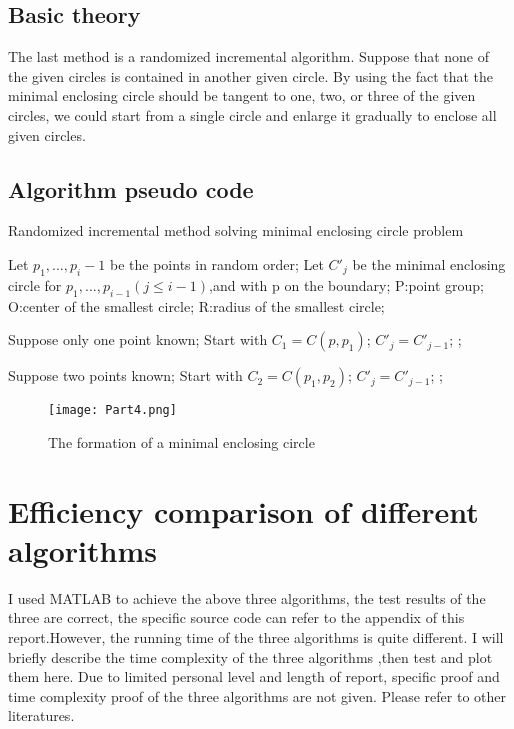 \documentclass[a4paper, 12pt]{article}
\begin{document}
\subsection{Basic theory}
%
The last method  is a randomized incremental algorithm. Suppose that none of the given circles is contained in another given circle. By using the fact that the minimal enclosing circle should be tangent to one, two, or three of the given circles, we could start from a single circle and enlarge it gradually to enclose all given circles.


\subsection{Algorithm pseudo code}
%
\begin{algorithm}[h]  
  \caption{Randomized incremental method solving minimal enclosing circle problem}  
  \label{alg::Linear-Time method}  
  \begin{algorithmic}[1]  
    \State Let $p_1,...,p_i-1$ be the points in random order;
    \State Let $C'_j$ be the minimal enclosing circle for $p_1,...,p_{i-1}(j \leq i-1)$,and with p on the boundary;  
    \Require  
      P:point group;  
    \Ensure  
      O:center of the smallest circle;
      R:radius of the smallest circle;

    \State Suppose only one point known;
    \State Start with $C_1=C(p,p_1)$;
     $C'_j=C'_{j-1}$;
    ; 
    \EndIf
    \EndFor 
    
    \State Suppose two points known;
    \State Start with $C_2=C(p_1,p_2)$;
     $C'_j=C'_{j-1}$;
    ; 
    \EndIf
    \EndFor

  \end{algorithmic}  
\end{algorithm}

\begin{figure}[H]
	\centering 
	\texttt{[image: Part4.png]} 
	\caption{The formation of a minimal enclosing circle} 
	\label{fig:Formation}  
\end{figure}

\newpage
\section{Efficiency comparison of different algorithms}
%
I used MATLAB to achieve the above three algorithms, the test results of the three are correct, the specific source code can refer to the appendix of this report.However, the running time of the three algorithms is quite different. I will briefly describe the time complexity of the three algorithms ,then test and plot them here. Due to limited personal level and length of report, specific proof and time complexity proof of the three algorithms are not given. Please refer to other literatures.
\end{document}
